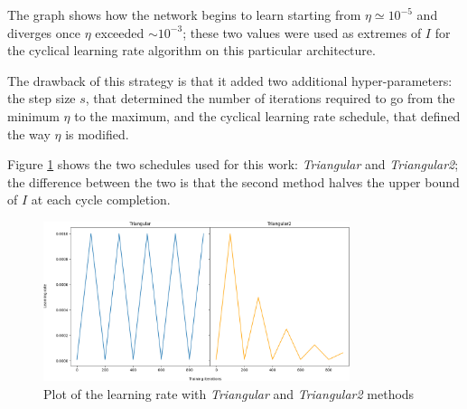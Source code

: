 The graph shows how the network begins to learn starting from $\eta \simeq 10^{-5}$ and diverges once $\eta$ exceeded $\sim10^{-3}$; these two values were used as extremes of $I$ for the cyclical learning rate algorithm on this particular architecture.\par
The drawback of this strategy is that it added two additional hyper-parameters: the step size $s$, that determined the number of iterations required to go from the minimum $\eta$ to the maximum, and the cyclical learning rate schedule, that defined the way $\eta$ is modified. \par

Figure \ref{fig:triangular} shows the two schedules used for this work: \emph{Triangular} and \emph{Triangular2};
the difference between the two is that the second method halves the upper bound of $I$ at each cycle completion.
\begin{figure}[ht!]
\centering
\includegraphics[width=0.8\textwidth]{images/triangular.png} 
\caption{Plot of the learning rate with \emph{Triangular} and \emph{Triangular2} methods}
\label{fig:triangular}
\end{figure}








